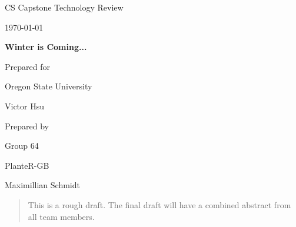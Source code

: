 \documentclass[onecolumn, draftclsnofoot,10pt, compsoc]{IEEEtran}
\def \CapstoneTeamName{			              			 PlanteR-GB}
\def \CapstoneTeamNumber{					           			 Group 64}
\def \GroupMemberOne{				           				Austin Hodgin}
\def \GroupMemberTwo{				           				Travis Hodgin}
\def \GroupMemberThree{			            Maximillian Schmidt}
\def \GroupMemberFour{		        	             Zach Lerew}
\def \CapstoneProjectName{	      	    Winter is Coming...}
\def \CapstoneSponsorCompany{		    Oregon State University}
\def \CapstoneSponsorPerson{		 			  				 Victor Hsu}
\def \DocType{		%
				Technology Review
				}
\newcommand{\NameSigPair}[1]{\par
\makebox[2.75in][r]{#1} \hfil 	\makebox[3.25in]{\makebox[2.25in]{\hrulefill} \hfill		\makebox[.75in]{\hrulefill}}
\par\vspace{-12pt} \textit{\tiny\noindent
\makebox[2.75in]{} \hfil		\makebox[3.25in]{\makebox[2.25in][r]{Signature} \hfill	\makebox[.75in][r]{Date}}}}
\renewcommand{\NameSigPair}[1]{#1}
\begin{document}
\begin{titlepage}
    \begin{singlespace}
        \hfill


        \par\vspace{.2in}
        \centering
        \scshape{
            \huge CS Capstone \DocType \par
            {\large\today}\par
            \vspace{.5in}
            \textbf{\Huge\CapstoneProjectName}\par

						\vspace{1in}

            {\large Prepared for}\par
            \Huge \CapstoneSponsorCompany\par
            \vspace{5pt}
            {\Large\NameSigPair{\CapstoneSponsorPerson}\par}

						\vspace{1in}

            {\large Prepared by}\par
						{\huge \CapstoneTeamNumber}\par
            \CapstoneTeamName\par
            \vspace{5pt}

            {
							\Large
							\NameSigPair{\GroupMemberThree}\par
            }

            \vspace{20pt}
        }

				\newpage
        \begin{abstract}
				\noindent This is a rough draft. The final draft will have a combined abstract from all team members.
        \end{abstract}
    \end{singlespace}
\end{titlepage}
\end{document}
